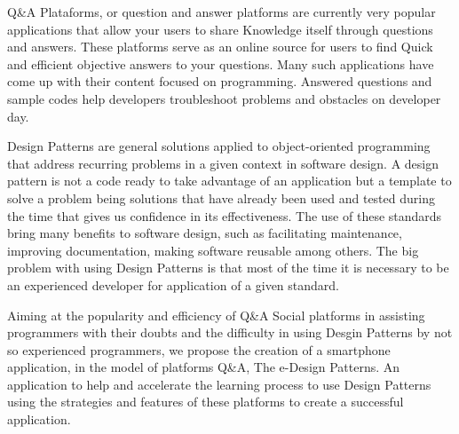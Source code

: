 Q\&A Plataforms, or question and answer platforms are currently very popular applications that allow your users to share Knowledge itself
 through questions and answers. These platforms serve as an online source for users to find Quick and efficient objective answers to your
 questions. Many such applications have come up with their content focused on programming. Answered questions and sample codes help
 developers troubleshoot problems and obstacles on developer day.

Design Patterns are general solutions applied to object-oriented programming that address recurring problems in a given context in software design.
 A design pattern is not a code ready to take advantage of an application but a template to solve a problem being solutions that have already been
 used and tested during the time that gives us confidence in its effectiveness. The use of these standards bring many benefits to software design,
 such as facilitating maintenance, improving documentation, making software reusable among others. The big problem with using Design Patterns is
 that most of the time it is necessary to be an experienced developer for application of a given standard.

Aiming at the popularity and efficiency of Q\&A Social platforms in assisting programmers with their doubts and the difficulty in using Desgin Patterns
 by not so experienced programmers, we propose the creation of a smartphone application, in the model of platforms Q\&A, The e-Design Patterns.
 An application to help and accelerate the learning process to use Design Patterns using the strategies and features of these platforms to create a successful application.